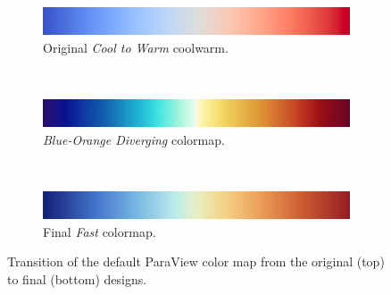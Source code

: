 \documentclass{IEEEcsmag}
\newcommand*{\colormap}[1]{\textsl{#1}\xspace}
\newcommand*{\coolwarm}{\colormap{Cool to Warm}}
\newcommand*{\blueorange}{\colormap{Blue-Orange Diverging}}
\newcommand*{\fast}{\colormap{Fast}}
\begin{document}
\begin{figure}[htb]
  \begin{subfigure}{\linewidth}
    \includegraphics[width=\linewidth]{map-cool-to-warm}
    \vspace{-1.4\baselineskip}
    \caption{Original \coolwarm coolwarm.}
    \label{fig:design:coolwarm}
  \end{subfigure}\\[4pt]
  \begin{subfigure}{\linewidth}
    \includegraphics[width=\linewidth]{map-blue-orange-diverging}
    \vspace{-1.4\baselineskip}
    \caption{\blueorange colormap.}
    \label{fig:design:blueorange}
  \end{subfigure}\\[4pt]
  \begin{subfigure}{\linewidth}
    \includegraphics[width=\linewidth]{map-fast}
    \vspace{-1.4\baselineskip}
    \caption{Final \fast colormap.}
    \label{fig:design:fast}
  \end{subfigure}
  \caption{
    Transition of the default ParaView color map from the original (top) to final (bottom) designs.
  }
  \label{fig:designs}
\end{figure}
\end{document}
